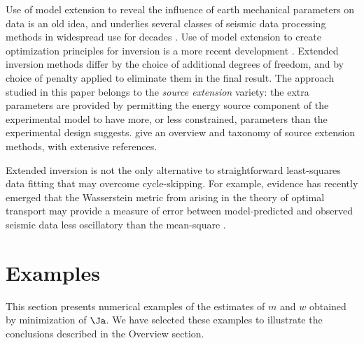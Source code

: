 Use of model extension to reveal the influence of earth mechanical
parameters on data is an old idea, and underlies several classes of
seismic data processing methods in widespread use for decades
\cite[]{geoprosp:2008}. Use of model extension to create optimization
principles for inversion is a more recent development
\cite[]{SymesCar:91,Plessix:00a,Symes:09,LuoSava:11,BiondiAlmomin:SEG12,LeeuwenHerrmannWRI:13,LiuSymesLi:14,Warner:14,ChaurisGP:14,Warner:16,LeeuwenHerrmann:16,Herve2017,HouSymes:Geo18}. Extended
inversion methods differ by the choice of additional degrees of
freedom, and by choice of penalty applied to eliminate them in the
final result. The approach studied in this paper belongs to the {\em
  source extension} variety: the extra parameters are provided by
permitting the energy source component of the experimental model to
have more, or less constrained, parameters than the experimental
design suggests. \cite{HuangNammourSymesDollizal:SEG19} give an
overview and taxonomy of source extension methods, with extensive
references.

Extended inversion is not the only alternative to straightforward
least-squares data fitting that may overcome cycle-skipping. For
example, evidence has recently emerged that the Wasserstein metric
from arising in the theory of optimal transport may provide a measure
of error between model-predicted and observed seismic data less
oscillatory than the mean-square
\cite[]{EngquistYang:GEO18,Metivier:GEO18}. 


\section{Examples}
This section presents numerical examples of the estimates of $m$ and
$w$ obtained by minimization of $\Ja$. We have selected these examples
to illustrate the conclusions described in the Overview section.

